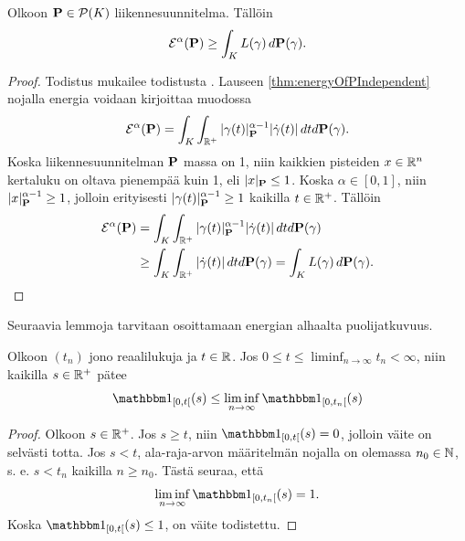 \documentclass[12pt,oneside,a4paper]{amsbook} %
\begin{document}
\begin{lemma}\label{le:nrgGeThanLength}
    Olkoon $\P \in \mathcal{P}(K)$ liikennesuunnitelma. Tällöin
        \begin{equation*}
            \E^\alpha(\P) \ge \int_K L(\gamma) \, d\P(\gamma).
        \end{equation*}
\end{lemma}

\begin{proof}
    Todistus mukailee todistusta \cite[s. 36]{optimal}. Lauseen \ref{thm:energyOfPIndependent} nojalla energia voidaan kirjoittaa muodossa
    \begin{equation*}
        \E^\alpha(\P) = \int_K \int_{\R^+}|\gamma(t)|^{\alpha-1}_\P|\dot\gamma(t)| \, dtd\P(\gamma).
    \end{equation*}
     Koska liikennesuunnitelman $\P$ massa on 1, niin kaikkien pisteiden $x \in \R^n$ kertaluku on oltava pienempää kuin 1, eli  $|x|_\P \le 1$. Koska $\alpha \in [0, 1]$, niin  $|x|^{\alpha-1}_\P \ge 1$, jolloin erityisesti $|\gamma(t)|^{\alpha-1}_\P \ge 1$ kaikilla $t \in \Rp$. Tällöin
    \begin{align*}
        \E^\alpha(\P) &= \int_K \int_{\R^+}|\gamma(t)|^{\alpha-1}_\P|\dot\gamma(t)| \, dtd\P(\gamma) \\ 
        &\ge \int_K \int_{\R^+}|\dot\gamma(t)| \, dtd\P(\gamma) = \int_K L(\gamma) \, d\P(\gamma).
    \end{align*}
\end{proof}

Seuraavia lemmoja tarvitaan osoittamaan energian alhaalta puolijatkuvuus.
\begin{lemma} \label{le:indFct}
    Olkoon $(t_n)$ jono reaalilukuja ja $t\in \R$.
    Jos $\displaystyle 0 \le t \le \liminf_{n\to\infty} t_n < \infty$, niin kaikilla $s \in \Rp$ pätee
         \begin{equation*}
             \indfct{[0, t[}(s) \le \liminf_{n\to\infty} \indfct{[0, t_n[}(s)
         \end{equation*}
 \end{lemma}
\begin{proof}
    Olkoon $s \in \Rp$. Jos $s \ge t$, niin $\indfct{[0, t[}(s) = 0$, jolloin väite on selvästi totta.
    Jos $s < t$, ala-raja-arvon määritelmän nojalla on olemassa $n_0 \in \N$, s. e. $s < t_n$ kaikilla $n \ge n_0$. Tästä seuraa, että
        \begin{equation*}
            \liminf_{n \to \infty} \indfct{[0, t_n[}(s) = 1.
        \end{equation*}
    Koska $\indfct{[0, t[}(s) \le 1$, on väite todistettu.
\end{proof} 
\end{document}
